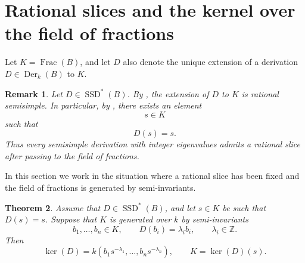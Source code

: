 \documentclass[12pt]{amsart}
\newtheorem{theorem}{Theorem}[section]
\newtheorem{remark}[theorem]{Remark}
\newcommand{\Z}{\mathbb Z}
\newcommand{\Der}{\operatorname{Der}}
\newcommand{\Frac}{\operatorname{Frac}}
\newcommand{\SSD}{\operatorname{SSD}}
\begin{document}
\section{Rational slices and the kernel over the field of fractions}

Let $K=\Frac(B)$, and let $D$ also denote the unique extension of a derivation
$D\in \Der_k(B)$ to $K$.

\begin{remark}\label{rem:CiLi-rational}
Let $D\in \SSD^{*}(B)$. By \cite[Definition 2.5 and Theorem 2.14]{CiLi22},
the extension of $D$ to $K$ is rational semisimple. In particular, by
\cite[Corollary 3.3]{CiLi22}, there exists an element
\[
s\in K
\]
such that
\[
D(s)=s.
\]
Thus every semisimple derivation with integer eigenvalues admits a rational slice after passing to the field of fractions.
\end{remark}

In this section we work in the situation where a rational slice has been fixed and the
field of fractions is generated by semi-invariants.

\begin{theorem}\label{thm:kernel-fraction-field}
Assume that $D\in \SSD^{*}(B)$, and let $s\in K$ be such that $D(s)=s$.
Suppose that $K$ is generated over $k$ by semi-invariants
\[
b_1,\dots,b_n\in K,
\qquad
D(b_i)=\lambda_i b_i,
\qquad
\lambda_i\in \Z.
\]
Then
\[
\ker(D)=k\left(b_1s^{-\lambda_1},\dots,b_ns^{-\lambda_n}\right),
\qquad
K=\ker(D)(s).
\]
\end{theorem}
\end{document}

